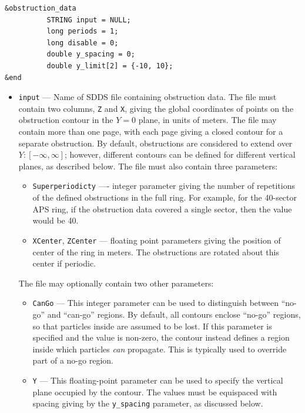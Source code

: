 \documentclass[11pt]{article}
\begin{document}
\begin{verbatim}
&obstruction_data
          STRING input = NULL;
          long periods = 1;
          long disable = 0;
          double y_spacing = 0;
          double y_limit[2] = {-10, 10};
&end
\end{verbatim}

\begin{itemize}

\item \verb|input| --- Name of SDDS file containing obstruction data. The file must contain two columns, \verb|Z| and 
  \verb|X|, giving the global coordinates of points on the obstruction contour in the $Y=0$ plane, in units of meters.
  The file may contain more than one page, with each page giving a closed contour for a separate obstruction.
  By default, obstructions are considered to extend over $Y:[-\infty, \infty]$; however, different contours can be
  defined for different vertical planes, as described below.
  The file must also contain three parameters: 
  \begin{itemize}
  \item \verb|Superperiodicty| ---- integer parameter giving the number of repetitions of the
    defined obstructions in the full ring. For example, for the 40-sector APS ring, if the obstruction data covered
    a single sector, then the value would be 40.
  \item \verb|XCenter|, \verb|ZCenter| --- floating point parameters giving the position of center of the ring in meters.
    The obstructions are rotated about this center if periodic.
  \end{itemize}
  The file may optionally contain two other parameters:
  \begin{itemize}
    \item \verb|CanGo| --- This integer parameter can be used to distinguish between ``no-go'' and ``can-go'' 
      regions. By default, all contours enclose ``no-go'' regions, so that particles inside are assumed to be
      lost. If this parameter is specified and the value is non-zero, the contour instead defines a region inside which
      particles {\em can} propagate. This is typically used to override part of a no-go region.
      \item \verb|Y| --- This floating-point parameter can be used to specify the vertical plane occupied by the
         contour. The values must be equispaced with spacing giving by the \verb|y_spacing| parameter, as discussed below.
  \end{itemize}

\end{itemize}
\end{document}
